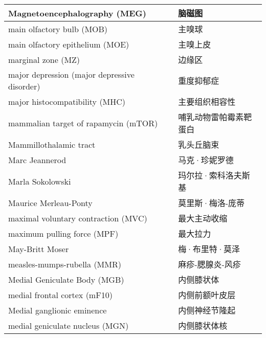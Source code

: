 \begin{longtable}{lll}
	\midrule
	Magnetoencephalography (MEG)   && 脑磁图  \\
	
	\midrule
	main olfactory bulb (MOB) && 主嗅球  \\
	
	\midrule
	main olfactory epithelium (MOE)  && 主嗅上皮  \\
	
	\midrule
	marginal zone (MZ)   && 边缘区  \\
	
	\midrule
	major depression (major depressive disorder)   && 重度抑郁症  \\
	
	\midrule
	major histocompatibility (MHC)   && 主要组织相容性  \\
	
	\midrule
	mammalian target of rapamycin (mTOR)   && 哺乳动物雷帕霉素靶蛋白  \\
	
	\midrule
	Mammillothalamic tract   && 乳头丘脑束  \\
	
	\midrule
	Marc Jeannerod   && 马克·珍妮罗德  \\
	
	\midrule
	Marla Sokolowski   && 玛尔拉·索科洛夫斯基 \\
	
	\midrule
	Maurice Merleau-Ponty   && 莫里斯·梅洛-庞蒂  \\
	
	\midrule
	maximal voluntary contraction (MVC)   && 最大主动收缩  \\
	
	\midrule
	maximum pulling force (MPF)   && 最大拉力  \\
	
	\midrule
	May-Britt Moser   && 梅·布里特·莫泽  \\
	
	\midrule
	measles-mumps-rubella (MMR)   && 麻疹-腮腺炎-风疹  \\
	
	\midrule
	Medial Geniculate Body (MGB)   && 内侧膝状体  \\
	
	\midrule
	medial frontal cortex (mF10)   && 内侧前额叶皮层  \\
	
	\midrule
	Medial ganglionic eminence   && 内侧神经节隆起  \\
	
	\midrule
	medial geniculate nucleus (MGN)  && 内侧膝状体核  \\
	

\end{longtable}
